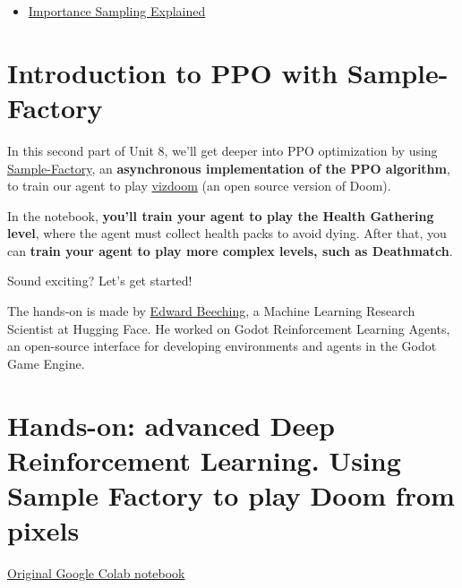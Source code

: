 \documentclass[11pt,a4paper]{article}
\begin{document}
\begin{itemize}
\tightlist
\item
  \href{https://youtu.be/C3p2wI4RAi8}{Importance Sampling Explained}
\end{itemize}

\section{Introduction to PPO with Sample-Factory}\label{introduction-to-ppo-with-sample-factory}


In this second part of Unit 8, we'll get deeper into PPO optimization by using \href{https://samplefactory.dev/}{Sample-Factory}, an \textbf{asynchronous implementation of the PPO algorithm}, to train our agent to play \href{https://vizdoom.cs.put.edu.pl/}{vizdoom} (an open source version of Doom).

In the notebook, \textbf{you'll train your agent to play the Health Gathering level}, where the agent must collect health packs to avoid dying. After that, you can \textbf{train your agent to play more complex levels, such as Deathmatch}.


Sound exciting? Let's get started!

The hands-on is made by \href{https://twitter.com/edwardbeeching}{Edward Beeching}, a Machine Learning Research Scientist at Hugging Face. He worked on Godot Reinforcement Learning Agents, an open-source interface for developing environments and agents in the Godot Game Engine.

\section{Hands-on: advanced Deep Reinforcement Learning. Using Sample Factory to play Doom from pixels}\label{hands-on-advanced-deep-reinforcement-learning.-using-sample-factory-to-play-doom-from-pixels}

\href{https://colab.research.google.com/github/huggingface/deep-rl-class/blob/main/notebooks/unit8/unit8_part2.ipynb}{Original Google Colab notebook}
\end{document}
